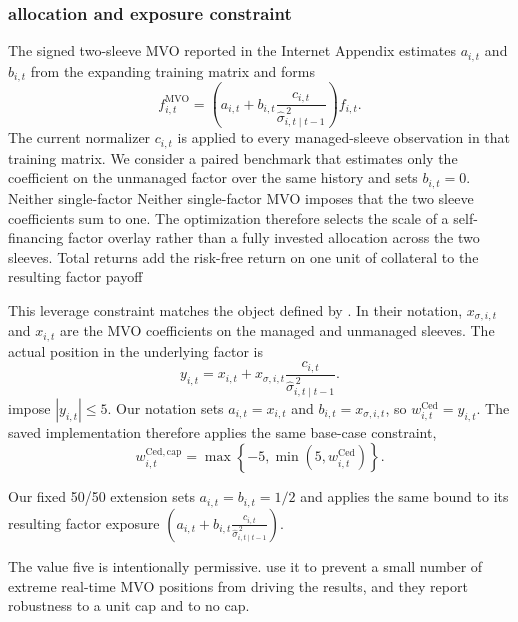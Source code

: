 \documentclass[preprint,12pt,authoryear]{elsarticle}
\begin{document}
\begin{appendices}
\subsubsection{\citet{cederburg2020} allocation and exposure constraint}

The signed two-sleeve MVO reported in the Internet Appendix estimates $a_{i,t}$ and $b_{i,t}$ from the expanding training matrix and forms
\begin{equation}
f^{\mathrm{MVO}}_{i,t}
=\left(a_{i,t}+b_{i,t}
\frac{c_{i,t}}{\widehat{\sigma}^{\,2}_{i,t\mid t-1}}\right)f_{i,t}.
\label{eq:cederburg-mvo}
\end{equation}
The current normalizer $c_{i,t}$ is applied to every managed-sleeve observation in that training matrix. We consider a paired benchmark that estimates only the coefficient on the unmanaged factor over the same history and sets $b_{i,t}=0$. Neither single-factor Neither single-factor MVO imposes that the two sleeve coefficients sum to one. The optimization therefore selects the scale of a self-financing factor overlay rather than a fully invested allocation across the two sleeves. Total returns add the risk-free return on one unit of collateral to the resulting factor payoff

This leverage constraint matches the object defined by \citet{cederburg2020}. In their notation, $x_{\sigma,i,t}$ and $x_{i,t}$ are the MVO coefficients on the managed and unmanaged sleeves. The actual position in the underlying factor is
\begin{equation}
y_{i,t}
=x_{i,t}
+x_{\sigma,i,t}
\frac{c_{i,t}}{\widehat{\sigma}^{\,2}_{i,t\mid t-1}}.
\end{equation}
\citet{cederburg2020} impose $|y_{i,t}|\leq5$. Our notation sets $a_{i,t}=x_{i,t}$ and $b_{i,t}=x_{\sigma,i,t}$, so $w^{\mathrm{Ced}}_{i,t}=y_{i,t}$. The saved implementation therefore applies the same base-case constraint,
\begin{equation}
w^{\mathrm{Ced,cap}}_{i,t}
=\max\left\{-5,\min\left(5,w^{\mathrm{Ced}}_{i,t}\right)\right\}.
\end{equation}

Our fixed 50/50 extension sets $a_{i,t}=b_{i,t}=1/2$ and applies the same bound to its resulting factor exposure $\left(a_{i,t}+b_{i,t}
\frac{c_{i,t}}{\widehat{\sigma}^{\,2}_{i,t\mid t-1}}\right)$. 

The value five is intentionally permissive. \citet{cederburg2020} use it to prevent a small number of extreme real-time MVO positions from driving the results, and they report robustness to a unit cap and to no cap. 


\end{appendices}
\end{document}
